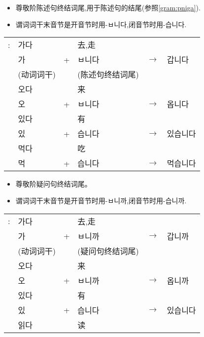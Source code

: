 \section{}
\begin{grammar}
    \begin{grammarsect}
        \begin{itemize}
            \item 尊敬阶陈述句终结词尾,用于陈述句的结尾(参照\ref{gram:pniga}).
            \item 谓词词干末音节是开音节时用-ㅂ니다,闭音节时用-습니다.
        \end{itemize}
        \begin{tabular}{llllll}
            \ruby{例}{예}:&가다&&去,走\\
            &가&+&ㅂ니다&$\to$&갑니다\\
            &(动词词干)&&(陈述句终结词尾)\\
            &오다&&来\\
            &오&+&ㅂ니다&$\to$&옵니다\\
            &있다&&有\\
            &있&+&습니다&$\to$&있습니다\\
            &먹다&&吃\\
            &먹&+&습니다&$\to$&먹습니다\\
        \end{tabular}
    \end{grammarsect}
    \begin{grammarsect}\label{gram:pniga}
        \begin{itemize}
            \item 尊敬阶疑问句终结词尾。
            \item 谓词词干末音节是开音节时用-ㅂ니까,闭音节时用-습니까.
        \end{itemize}
        \begin{tabular}{llllll}
            \ruby{例}{예}:&가다&&去,走\\
            &가&+&ㅂ니까&$\to$&갑니까\\
            &(动词词干)&&(疑问句终结词尾)\\
            &오다&&来\\
            &오&+&ㅂ니까&$\to$&옵니까\\
            &있다&&有\\
            &있&+&습니다&$\to$&있습니다\\
            &읽다&&读\\

\end{tabular}
\end{grammarsect}
\end{grammar}

